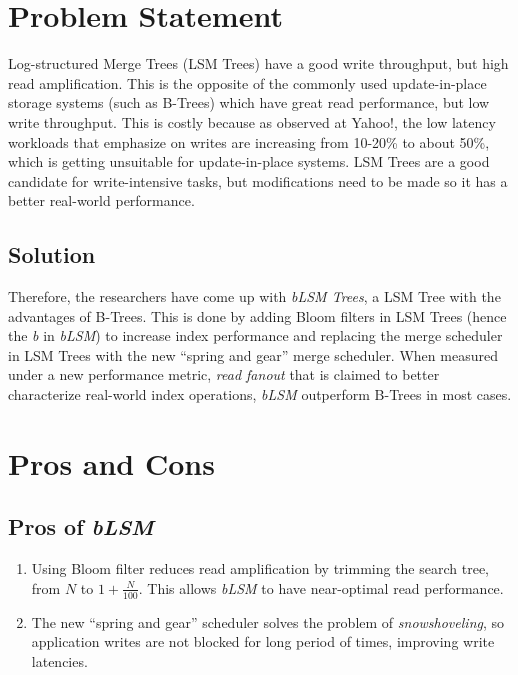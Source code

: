 \documentclass{article}
\title{\mytitle}
\author{\myname}
\date{\today}
\theoremstyle{plain}
\begin{document}
\maketitle
\section{Problem Statement}

\cite{10.1145/2213836.2213862} Log-structured Merge Trees (LSM Trees) have a
good write throughput, but high read amplification. This is the opposite of the
commonly used update-in-place storage systems (such as B-Trees) which have great
read performance, but low write throughput. This is costly because as observed
at Yahoo!, the low latency workloads that emphasize on writes are increasing
from 10-20\% to about 50\%, which is getting unsuitable for update-in-place
systems. LSM Trees are a good candidate for write-intensive tasks, but
modifications need to be made so it has a better real-world performance.

\subsection{Solution}
Therefore, the researchers have come up with \emph{bLSM Trees}, a LSM Tree with the
advantages of B-Trees. This is done by adding Bloom filters in LSM Trees (hence
the \emph{b} in \emph{bLSM}) to increase index performance and replacing the
merge scheduler in LSM Trees with the new ``spring and gear'' merge scheduler.
When measured under a new performance metric, \emph{read fanout} that is claimed
to better characterize real-world index operations, \emph{bLSM} outperform
B-Trees in most cases.

\section{Pros and Cons}
\subsection{Pros of \emph{bLSM}}
\begin{enumerate}
\item Using Bloom filter reduces read amplification by trimming the search tree,
from $N$ to $1 + \frac{N}{100}$. This allows \emph{bLSM} to have near-optimal
read performance.
\item The new ``spring and gear'' scheduler solves the problem of
\emph{snowshoveling}, so application writes are not blocked for long period of
times, improving write latencies.
\end{enumerate}
\end{document}
